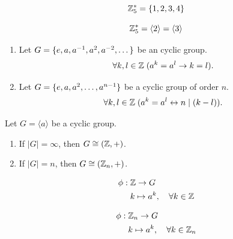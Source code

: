 \begin{frame}
  \[
    \mathbb{Z}^{\ast}_{5} = \{1, 2, 3, 4\}
  \]

  \pause
  \[
    \mathbb{Z}^{\ast}_{5} = \langle 2 \rangle = \langle 3 \rangle
  \]
\end{frame}

\begin{frame}{}
  \begin{theorem}
    \begin{enumerate}[<+->][(1)]
      \setlength{\itemsep}{6pt}
      \item Let $G = \{e, a, a^{-1}, a^2, a^{-2}, \dots\}$
        be an  cyclic group.
        \[
          \forall k, l \in \mathbb{Z}\; (a^k = a^l \to k = l).
        \]
      \item Let $G = \{e, a, a^2, \dots, a^{n-1}\}$
        be a  cyclic group of order $n$.
        \[
          \forall k, l \in \mathbb{Z}\; (a^{k} = a^{l} \leftrightarrow n \mid (k-l)).
        \]
    \end{enumerate}
  \end{theorem}
\end{frame}

\begin{frame}
  \begin{theorem}
    Let $G = \langle a \rangle$ be a cyclic group.
    \begin{enumerate}[(1)]
      \setlength{\itemsep}{6pt}
      \item If $|G| = \infty$, then $G \cong (\mathbb{Z}, +)$.
      \item If $|G| = n$, then $G \cong (\mathbb{Z}_{n}, +)$.
    \end{enumerate}
  \end{theorem}

  \pause
  \begin{align*}
    \phi:\; &\mathbb{Z} \to G \\
    &k \mapsto a^{k}, \quad \forall k \in \mathbb{Z}
  \end{align*}

  \pause
  \begin{align*}
    \phi:\; &\mathbb{Z}_{n} \to G \\
    &k \mapsto a^{k}, \quad \forall k \in \mathbb{Z}_{n}
  \end{align*}
\end{frame}

